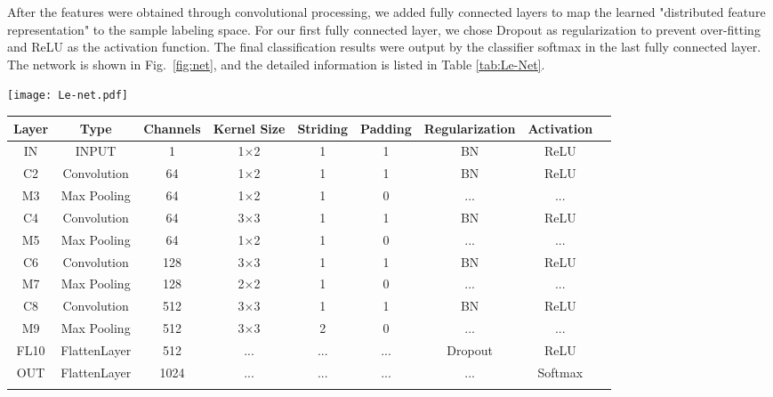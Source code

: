 \documentclass[usenatbib]{mnras}
\begin{document}
After the features were obtained through convolutional processing, we added fully connected layers to map the learned "distributed feature representation" to the sample labeling space. For our first fully connected layer, we chose Dropout \citep{6179821} as regularization to prevent over-fitting and ReLU as the activation function. The final classification results were output by the classifier softmax in the last fully connected layer. The network is shown in Fig.~\ref{fig:net}, and the detailed information is listed in Table \ref{tab:Le-Net}.

\begin{figure*}
\begin{center}
	\texttt{[image: Le-net.pdf]}
\end{center}
    \caption{Schematic diagram of the CNN model architecture. }
    \label{fig:net}
\end{figure*}


\begin{table*}
\centering

\caption{Architecture overview of the CNN model proposed in the study.\label{tab:Le-Net}}
\begin{tabular}{ccccccccc}
\toprule
Layer & Type & Channels & Kernel Size & Striding & Padding & Regularization & Activation \\
\midrule
IN & INPUT & 1 & 1$\times$2 & 1 & 1 & BN & ReLU  \\
C2 & Convolution & 64 & 1$\times$2 & 1 & 1 & BN & ReLU \\
M3 & Max Pooling & 64 & 1$\times$2 & 1 & 0 & ... & ... \\
C4 & Convolution & 64 & 3$\times$3 & 1 & 1 & BN & ReLU  \\
M5 & Max Pooling & 64 & 1$\times$2 & 1 & 0 & ... & ... \\
C6 & Convolution & 128 & 3$\times$3 & 1 & 1 & BN & ReLU  \\
M7 & Max Pooling & 128 & 2$\times$2 & 1 & 0 & ... & ... \\
C8 & Convolution & 512 & 3$\times$3 & 1 & 1 & BN & ReLU  \\
M9 & Max Pooling & 512 & 3$\times$3 & 2 & 0 & ... & ... \\
FL10 & FlattenLayer & 512 & ... & ... & ... & Dropout & ReLU \\
OUT & FlattenLayer & 1024 & ... & ... & ... & ... & Softmax \\

\bottomrule
\label{modt}
\end{tabular}
\end{table*}
\end{document}
